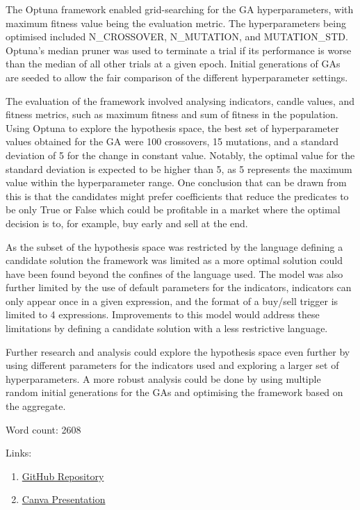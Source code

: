 \documentclass{IEEEtran}
\begin{document}
The Optuna framework enabled grid-searching for the GA hyperparameters, with maximum fitness value being the evaluation metric. The hyperparameters being optimised included N\_CROSSOVER, N\_MUTATION, and MUTATION\_STD. Optuna's median pruner was used to terminate a trial if its performance is worse than the median of all other trials at a given epoch. Initial generations of GAs are seeded to allow the fair comparison of the different hyperparameter settings. 

The evaluation of the framework involved analysing indicators, candle values, and fitness metrics, such as maximum fitness and sum of fitness in the population. Using Optuna to explore the hypothesis space, the best set of hyperparameter values obtained for the GA were 100 crossovers, 15 mutations, and a standard deviation of 5 for the change in constant value. Notably, the optimal value for the standard deviation is expected to be higher than 5, as 5 represents the maximum value within the hyperparameter range. One conclusion that can be drawn from this is that the candidates might prefer coefficients that reduce the predicates to be only True or False which could be profitable in a market where the optimal decision is to, for example, buy early and sell at the end.

As the subset of the hypothesis space was restricted by the language defining a candidate solution the framework was limited as a more optimal solution could have been found beyond the confines of the language used. The model was also further limited by the use of default parameters for the indicators, indicators can only appear once in a given expression, and the format of a buy/sell trigger is limited to 4 expressions. Improvements to this model would address these limitations by defining a candidate solution with a less restrictive language. 

Further research and analysis could explore the hypothesis space even further by using different parameters for the indicators used and exploring a larger set of hyperparameters. A more robust analysis could be done by using multiple random initial generations for the GAs and optimising the framework based on the aggregate. 

\appendix
Word count: 2608

Links:
\begin{enumerate}
    \item\href{https://github.com/Kaiqi-Liang/CITS4404-Project}{GitHub Repository}
    \item\href{https://www.canva.com/design/DAFiUpjY3qA/PVPR4jqosqTpl8IfKcmbGA/view?utm_content=DAFiUpjY3qA&utm_campaign=designshare&utm_medium=link&utm_source=recording_view}{Canva Presentation}
\end{enumerate}



\end{document}
